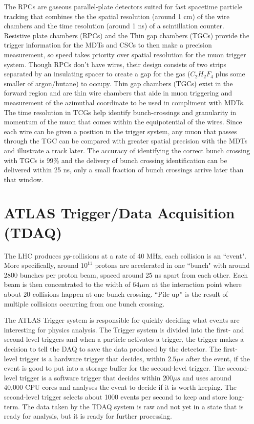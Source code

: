 The RPCs are gaseous parallel-plate detectors suited for fast spacetime particle tracking that combines the the spatial resolution (around 1 cm) of the wire chambers and the time resolution (around 1 ns) of a scintillation counter.
Resistive plate chambers (RPCs) and the Thin gap chambers (TGCs) provide the trigger information for the MDTs and CSCs to then make a precision measurement, so speed takes priority over spatial resolution for the muon trigger system. 
Though RPCs don't have wires, their design consists of two strips separated by an insulating spacer to create a gap for the gas ($C_2 H_2 F_4$ plus some smaller of argon/butane) to occupy.
Thin gap chambers (TGCs) exist in the forward region and are thin wire chambers that aide in muon triggering and measurement of the azimuthal coordinate to be used in compliment with MDTs.
The time resolution in TCGs help identify bunch-crossings and granularity in momentum of the muon that comes within the equipotential of the wires. 
Since each wire can be given a position in the trigger system, any muon that passes through the TGC can be compared with greater spatial precision with the MDTs and illustrate a track later.
The accuracy of identifying the correct bunch crossing with TGCs is 99\% and the delivery of bunch crossing identification can be delivered within 25 ns, only a small fraction of bunch crossings arrive later than that window.

\section{ATLAS Trigger/Data Acquisition (TDAQ)}

The LHC produces $pp$-collisions at a rate of 40 MHz, each collision is an ``event". 
More specifically, around $10^{11}$ protons are accelerated in one ``bunch" with around 2800 bunches per proton beam, spaced around 25 ns apart from each other. 
Each beam is then concentrated to the width of $64 \mu m$ at the interaction point where about 20 collisions happen at one bunch crossing. 
``Pile-up'' is the result of multiple collisions occurring from one bunch crossing.

The ATLAS Trigger system is responsible for quickly deciding what events are interesting for physics analysis.
The Trigger system is divided into the first- and second-level triggers and when a particle activates a trigger, the trigger makes a decision to tell the DAQ to save the data produced by the detector. 
The first-level trigger is a hardware trigger that decides, within $2.5 \mu s$ after the event, if the event is good to put into a storage buffer for the second-level trigger.
The second-level trigger is a software trigger that decides within $200 \mu s$ and uses around 40,000 CPU-cores and analyses the event to decide if it is worth keeping. 
The second-level trigger selects about 1000 events per second to keep and store long-term.\cite{Trigger-DAQ}
The data taken by the TDAQ system is raw and not yet in a state that is ready for analysis, but it is ready for further processing. 

